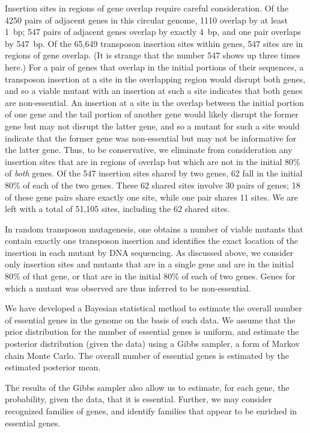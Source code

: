 \documentclass[letterpaper]{article}
\begin{document}
\begin{multicols}{2}
Insertion sites in regions of gene overlap require careful
consideration.  Of the 4250 pairs of adjacent genes in this circular
genome, 1110 overlap by at least 1~bp; 547 pairs of adjacent genes
overlap by exactly 4~bp, and one pair overlaps by 547~bp.  Of the
65,649 transposon insertion sites within genes, 547 sites are in
regions of gene overlap.  (It is strange that the number 547 shows up
three times here.)  For a pair of genes that overlap in the initial
portions of their sequences, a transposon insertion at a site in the
overlapping region would disrupt both genes, and so a viable mutant
with an insertion at such a site indicates that both genes are
non-essential.  An insertion at a site in the overlap between the
initial portion of one gene and the tail portion of another gene would
likely disrupt the former gene but may not disrupt the latter gene,
and so a mutant for such a site would indicate that the former gene
was non-essential but may not be informative for the latter gene.
Thus, to be conservative, we eliminate from consideration any
insertion sites that are in regions of overlap but which are not in
the initial 80\% of \emph{both\/} genes.  Of the 547 insertion sites
shared by two genes, 62 fall in the initial 80\% of each of the two
genes.  These 62 shared sites involve 30 pairs of genes; 18 of these
gene pairs share exactly one site, while one pair shares 11 sites.  We
are left with a total of 51,105 sites, including the 62 shared sites.

In random transposon mutagenesis, one obtains a number of viable
mutants that contain exactly one transposon insertion and identifies
the exact location of the insertion in each mutant by DNA sequencing.
As discussed above, we consider only insertion sites and mutants that
are in a single gene and are in the initial 80\% of that gene, or that
are in the initial 80\% of each of two genes.  Genes for which a
mutant was observed are thus inferred to be non-essential.

We have developed a Bayesian statistical method to estimate the
overall number of essential genes in the genome on the basis of such
data.  We assume that the prior distribution for the number of
essential genes is uniform, and estimate the posterior distribution
(given the data) using a Gibbs sampler, a form of Markov chain Monte
Carlo.  The overall number of essential genes is estimated by the 
estimated posterior mean.  

The results of the Gibbs sampler also allow us to estimate, for each
gene, the probability, given the data, that it is essential.  Further,
we may consider recognized families of genes, and identify families
that appear to be enriched in essential genes.


\end{multicols}
\end{document}
